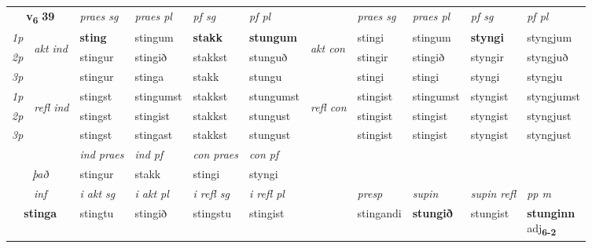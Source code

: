 \noindent
\begin{tabular}{lllllllllll} \toprule
\multicolumn{2}{c}{\textbf{v{\textsubscript{6}}} \Large{\textbf{39}}}  &  \textit{praes sg}  & \textit{praes pl}  &\textit{ pf sg} & \textit{pf pl} &  &  \textit{praes sg}  & \textit{praes pl}  & \textit{pf sg} & \textit{pf pl } \\*
	\cmidrule{3-6} \cmidrule{8-11}
 {\textit{1p}} & \multirow{3}{*}{\begin{turn}{90}\textit{akt ind}\end{turn}} & \textbf{sting} & stingum & \textbf{stakk} & \textbf{stungum} & \multirow{3}{*}{\begin{turn}{90}\textit{akt con}\end{turn}} &stingi & stingum & \textbf{styngi} & styngjum\\*
 {\textit{2p}} &  &  stingur  & stingið & stakkst & stunguð & & stingir & stingið & styngir & styngjuð \\*
{\textit{3p}} &  & stingur & stinga & stakk & stungu & & stingi & stingi& styngi & styngju \\*
\cmidrule{3-6} \cmidrule{8-11}
 {\textit{1p}} & \multirow{3}{*}{\begin{turn}{90}\textit{refl ind}\end{turn}}  & stingst & stingumst & stakkst & stungumst & \multirow{3}{*}{\begin{turn}{90}\textit{refl con}\end{turn}}  &stingist & stingumst & styngist & styngjumst \\*
 {\textit{2p}} &  & stingst & stingist & stakkst & stungust & &stingist & stingist & styngist & styngjust \\*
 {\textit{3p}}  & & stingst & stingast & stakkst & stungust & & stingist & stingist& styngist & styngjust \\*
\cmidrule{3-6} \cmidrule{8-11}

   & &  \textit{ind praes} & \textit{ind pf} & \textit{con praes} & \textit{con pf} \\*
\multicolumn{2}{c}{ \textit{það} } & stingur & stakk & stingi & styngi \\*

\cmidrule{3-11}
   \multicolumn{2}{c}{\textit{inf}}  & \textit{i akt sg} & \textit{i akt pl} & \textit{i refl sg} & \textit{i refl pl} && \textit{presp} & \textit{supin} & \textit{supin refl} & \textit{pp m} \\*
  \multicolumn{2}{c}{\textbf{stinga}} & stingtu  & stingið & stingstu & stingist && stingandi &  \textbf{stungið} & stungist & \specialcell{\textbf{stunginn} \\ adj\textbf{\textsubscript{6-2}}} \\*
\end{tabular}

